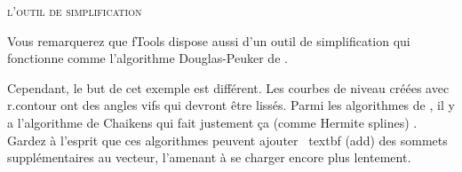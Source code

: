 \begin{Tip}\caption{\textsc{l'outil de simplification}}
Vous remarquerez que fTools dispose aussi d'un outil de simplification  qui fonctionne comme l'algorithme Douglas-Peuker de \grass {}.
\end{Tip}

Cependant, le but de cet exemple est différent. Les courbes de niveau créées avec r.contour ont des angles vifs qui devront être lissés. Parmi les algorithmes de , il y a l'algorithme de Chaikens qui fait justement ça (comme Hermite splines) . Gardez à l'esprit que ces algorithmes peuvent ajouter \ textbf (add) des sommets supplémentaires au vecteur, l'amenant à se charger encore plus lentement.

